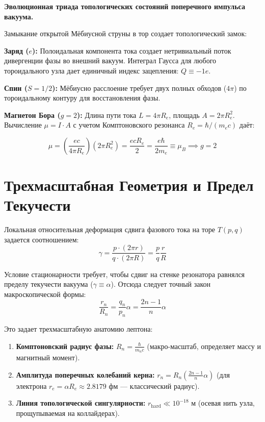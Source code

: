 \documentclass[12pt,a4paper]{article}
\begin{document}
				\textbf{Эволюционная триада топологических состояний поперечного импульса вакуума.}
						
			Замыкание открытой Мёбиусной струны в тор создает топологический замок:
			
				\textbf{Заряд ($e$):} Полоидальная компонента тока создает нетривиальный поток дивергенции фазы во внешний вакуум. Интеграл Гаусса для любого тороидального узла дает единичный индекс зацепления: $Q \equiv -1e$.
				
				\textbf{Спин ($S=1/2$):} Мёбиусно расслоение требует двух полных обходов ($4\pi$) по тороидальному контуру для восстановления фазы.
				
				\textbf{Магнетон Бора ($g=2$):} Длина пути тока $L = 4\pi R_e$, площадь $A = 2\pi R_e^2$. Вычисление $\mu = I \cdot A$ с учетом Комптоновского резонанса $R_e = \hbar / (m_e c)$ даёт:
				
				\begin{equation}
					\mu = \left(\frac{e c}{4\pi R_e}\right) (2\pi R_e^2) = \frac{e c R_e}{2} = \frac{e \hbar}{2 m_e} \equiv \mu_B \implies g = 2
				\end{equation}
						
			\section{Трехмасштабная Геометрия и Предел Текучести}
			Локальная относительная деформация сдвига фазового тока на торе $T(p,q)$ задается соотношением:
			\begin{equation}
				\gamma = \frac{p \cdot (2\pi r)}{q \cdot (2\pi R)} = \frac{p}{q} \frac{r}{R}
			\end{equation}
			
			Условие стационарности требует, чтобы сдвиг на стенке резонатора равнялся пределу текучести вакуума ($\gamma \equiv \alpha$). Отсюда следует точный закон макроскопической формы:
			\begin{equation}
				\frac{r_n}{R_n} = \frac{q_n}{p_n} \alpha = \frac{2n-1}{n} \alpha
			\end{equation}
			
			Это задает трехмасштабную анатомию лептона:
			\begin{enumerate}
				\item \textbf{Комптоновский радиус фазы:} $R_n = \frac{\hbar}{m_n c}$ (макро-масштаб, определяет массу и магнитный момент).
				\item \textbf{Амплитуда поперечных колебаний керна:} $r_n = R_n \left( \frac{2n-1}{n} \alpha \right)$ (для электрона $r_e = \alpha R_e \approx 2.8179 \text{ фм}$ — классический радиус).
				\item \textbf{Линия топологической сингулярности:} $r_{\text{hard}} \ll 10^{-18} \text{ м}$ (осевая нить узла, прощупываемая на коллайдерах).
			\end{enumerate}
			
\end{document}
